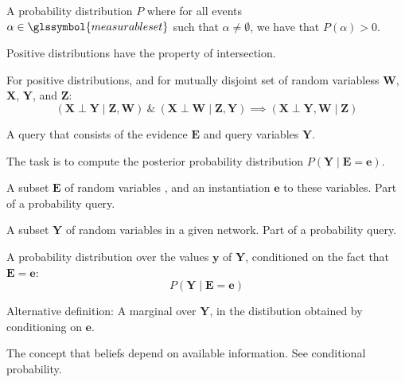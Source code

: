 {%
  A \gls{probability distribution} $P$ where for all events $\alpha\in\glssymbol{measurable set}$ such that $\alpha\neq\emptyset$, we have that $P(\alpha)>0$.

  Positive distributions have the property of \gls{intersection}.
}

{%
  For \glspl{positive distribution}, and for mutually disjoint \glspl{set of random variables} $\bm{W}$, $\bm{X}$, $\bm{Y}$, and $\bm{Z}$:
  \begin{equation*}
    (\bm{X}\perp\bm{Y}\mid\bm{Z},\bm{W})~\&~(\bm{X}\perp\bm{W}\mid\bm{Z},\bm{Y})\implies(\bm{X}\perp\bm{Y},\bm{W}\mid\bm{Z})
  \end{equation*}
}

{%
  A query that consists of the \gls{evidence} $\bm{E}$ and \gls{query variables} $\bm{Y}$.

  The task is to compute the \gls{posterior probability distribution} $P(\bm{Y}\mid\bm{E}=\bm{e})$.
}

{%
  A subset $\bm{E}$ of \glspl{random variable} , and an instantiation $\bm{e}$ to these variables. Part of a \gls{probability query}.
}

{%
  A subset $\bm{Y}$ of \glspl{random variable} in a given network. Part of a \gls{probability query}.
}

{%
  A \gls{probability distribution} over the values $\bm{y}$ of $\bm{Y}$, conditioned on the fact that $\bm{E}=\bm{e}$:
  \begin{equation*}
    P(\bm{Y}\mid\bm{E}=\bm{e})
  \end{equation*}

  Alternative definition: A marginal over $\bm{Y}$, in the distibution obtained by \gls{conditioning} on $\bm{e}$.
}

{%
  The concept that beliefs depend on available information. See \gls{conditional probability}.
}

